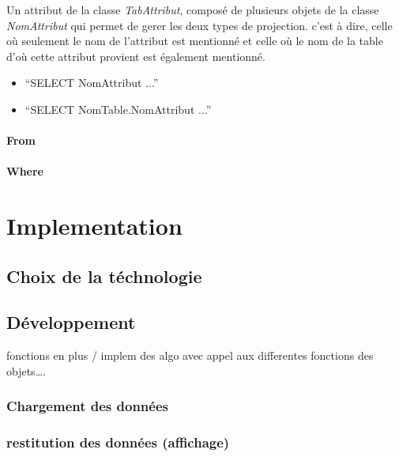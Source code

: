 \documentclass[oneside,13pt,a4paper]{report}
\begin{document}
Un attribut de la classe \textit{TabAttribut}, composé de plusieurs objets de la classe \textit{NomAttribut} qui permet de gerer les deux types de projection.
c'est à dire, celle où seulement le nom de l'attribut est mentionné et celle où le nom de la table d'où cette attribut provient est également mentionné.
\begin{itemize}
	\item \enquote{SELECT NomAttribut ...}
	\item \enquote{SELECT NomTable.NomAttribut ...}
\end{itemize}

\subsubsection{From}

\subsubsection{Where}



\chapter{Implementation}

\section{Choix de la téchnologie}

\section{Développement}

fonctions en plus / implem des algo avec appel aux differentes fonctions des objets….

\subsection{Chargement des données}

\subsection{restitution des données (affichage)}
\end{document}
